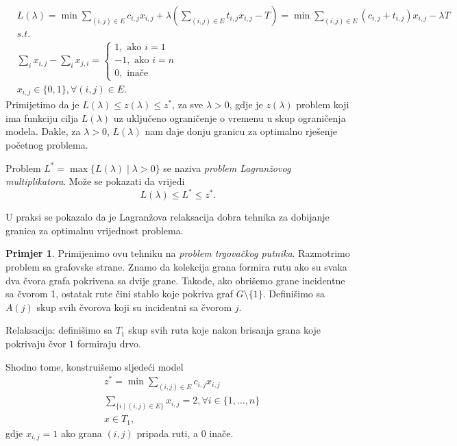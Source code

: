\documentclass[a4paper, utf8, 11pt, colorlinks]{book}
\theoremstyle{definition}
\newtheorem{primjer}{Primjer}[chapter]
\begin{document}
\begin{align*}
       &L(\lambda)= \min\sum_{(i,j) \in E }c_{i,j}x_{i,j}  + \lambda(\sum_{(i,j) \in E} t_{i,j} x_{i,j} - T ) = \min \sum_{(i,j) \in E} (c_{i,j} + t_{i,j} )x_{i,j} - \lambda T \\
        &{s.t. }\\
    & \sum_{i} x_{i,j} - \sum_{i} x_{j,i} = \begin{cases}  
                                               1, \mbox{ ako } i=1 \\
                                              -1, \mbox{ ako } i=n \\
                                               0, \mbox{ inače }
                                            \end{cases} \\
     & x_{i,j} \in \{0, 1 \}, \forall (i,j) \in E.
\end{align*}
Primijetimo da je $L(\lambda) \leq z(\lambda)  \leq z^*$, za sve $\lambda > 0$, gdje je $z(\lambda)$ problem koji ima funkciju cilja $L(\lambda)$ uz uključeno ograničenje o vremenu u skup ograničenja modela. Dakle, za $\lambda >0$, $L(\lambda)$ nam daje donju granicu za optimalno rješenje početnog problema. 

Problem $L^* = \max \{ L(\lambda) \mid \lambda > 0  \}$ se naziva \emph{problem Lagranžovog multiplikatora}. Može se pokazati da vrijedi 
$$ L(\lambda) \leq L^* \leq z^*.$$

U praksi se pokazalo da je Lagranžova relaksacija dobra tehnika za dobijanje granica za optimalnu vrijednost problema. 


\begin{primjer}
Primijenimo ovu tehniku na \emph{problem trgovačkog putnika}.  Razmotrimo  problem sa grafovske strane. Znamo da kolekcija grana formira rutu ako su svaka dva čvora grafa pokrivena sa dvije grane. Takođe, ako obrišemo grane incidentne sa čvorom 1, ostatak rute čini stablo koje pokriva graf  $G\setminus \{1\}$.  
Definišimo sa $A(j)$ skup svih čvorova koji su incidentni sa čvorom $j$. 
\end{primjer}
Relaksacija: definišimo sa $T_1$ skup svih ruta koje nakon brisanja grana koje pokrivaju čvor $1$ formiraju drvo.  

Shodno tome, konstruišemo sljedeći model
\begin{align*}
    &z^* = \min \sum_{(i,j)\in E} c_{i,j} x_{i,j}\\
    & \sum_{ \{ i \mid (i,j) \in E \} } x_{i,j} = 2, \forall i \in \{1,\ldots, n \} \\
    & x \in T_1,
\end{align*}
gdje $x_{i,j} = 1$ ako grana $(i,j)$ pripada ruti, a 0 inače.
\end{document}
